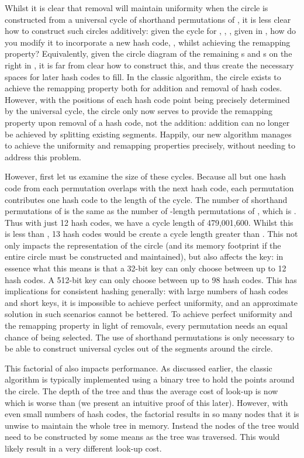 \documentclass[runningheads,a4paper]{llncs}
\begin{document}
Whilst it is clear that removal will maintain uniformity when the
circle is constructed from a universal cycle of shorthand permutations
of , it is less clear how to construct such circles additively:
given the cycle for , , ,  given in
, how do you modify it to incorporate a new
hash code, , whilst achieving the remapping property?
Equivalently, given the circle diagram of the remaining s and
s on the right in , it is far
from clear how to construct this, and thus create the necessary spaces
for later hash codes to fill. In the classic algorithm, the circle
exists to achieve the remapping property both for addition and removal
of hash codes. However, with the positions of each hash code point
being precisely determined by the universal cycle, the circle only now
serves to provide the remapping property upon removal of a hash code,
not the addition: addition can no longer be achieved by splitting
existing segments. Happily, our new algorithm manages to achieve the
uniformity and remapping properties precisely, without needing to
address this problem.

However, first let us examine the size of these cycles. Because all
but one hash code from each permutation overlaps with the next hash
code, each permutation contributes one hash code to the length of the
cycle. The number of shorthand permutations of  is the same as the
number of -length permutations of , which is . Thus with
just 12 hash codes, we have a cycle length of 479,001,600. Whilst this
is less than , 13 hash codes would be create a cycle length
greater than . This not only impacts the representation of the
circle (and its memory footprint if the entire circle must be
constructed and maintained), but also affects the key: in essence what
this means is that a 32-bit key can only choose between up to 12 hash
codes. A 512-bit key can only choose between up to 98 hash codes. This
has implications for consistent hashing generally: with large numbers
of hash codes and short keys, it is impossible to achieve perfect
uniformity, and an approximate solution in such scenarios cannot be
bettered. To achieve perfect uniformity and the remapping property in
light of removals, every permutation needs an equal chance of being
selected. The use of shorthand permutations is only necessary to be
able to construct universal cycles out of the segments around the
circle.

This factorial of  also impacts performance. As discussed
earlier, the classic algorithm is typically implemented using a binary
tree to hold the points around the circle. The depth of the tree and
thus the average cost of look-up is now  which is
worse than  (we present an intuitive proof of this
later). However, with even small numbers of hash codes, the factorial
results in so many nodes that it is unwise to maintain the whole tree
in memory. Instead the nodes of the tree would need to be constructed
by some means as the tree was traversed. This would likely result in a
very different look-up cost.
\end{document}
